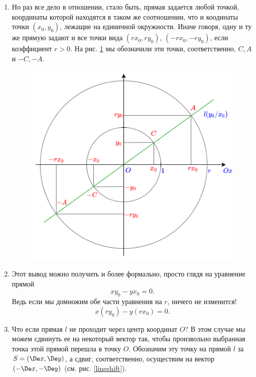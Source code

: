 \begin{enumerate}
\item Но раз все дело в отношении, стало быть, прямая задается любой точкой, координаты которой находятся в таком же соотношении, что и коодинаты точки $(x_0,y_0)$, лежащие на единичной окружности. Иначе говоря, одну и ту же прямую задают и все точки вида $(rx_0,ry_0)$, $(-rx_0,-ry_0)$, если коэффициент $r>0$. На рис. \ref{line} мы обозначили эти точки, соответственно, $C,A$ и $-C,-A$.
\begin{figure}[hbt!]
\begin{center}
\includegraphics[scale=0.3]{line.png}
\end{center}
\caption{}\label{line}
\end{figure}
\item Этот вывод можно получить и более формально, просто глядя на уравнение прямой
$$
xy_0-yx_0=0.
$$
Ведь если мы домножим обе части уравнения на $r$, ничего не изменится!
$$
x(ry_0)-y(rx_0)=0.
$$
\item Что если прямая $l$ не проходит через центр координат $O$? В этом случае мы можем сдвинуть ее на некоторый вектор так, чтобы произвольно выбранная точка этой прямой перешла в точку $O$. Обозначим эту точку на прямой $l$ за $S=(\De x,\De y)$, а сдвиг, соответственно, осуществим на вектор $(-\De x,-\De y)$ (см. рис. \ref{lineshift}).
\begin{figure}[hbt!]
\begin{center}

\end{center}
\end{figure}
\end{enumerate}
